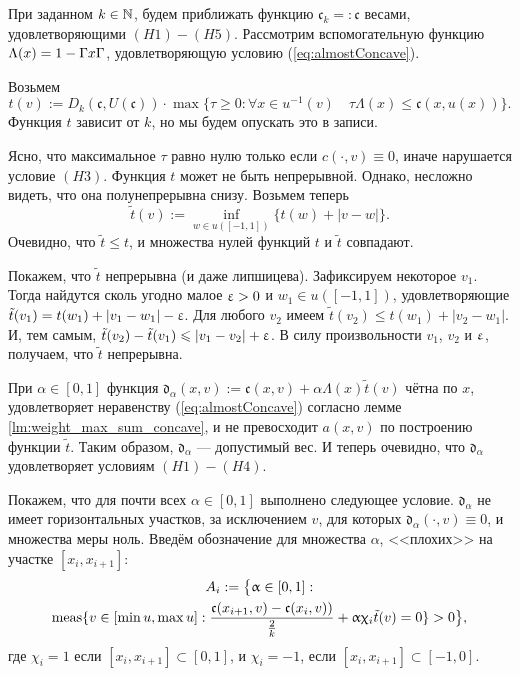 При заданном $k \in \mathbb N$, будем приближать функцию $\mathfrak c_k =: \mathfrak c$ весами, удовлетворяющими $(H1)-(H5)$.
Рассмотрим вспомогательную функцию $\Lambda(x) = 1 - \abs{x}$, удовлетворяющую условию (\ref{eq:almostConcave}).

Возьмем
$$
t(v):=D_k(\mathfrak c, U(\mathfrak c)) \cdot \max\{\tau \ge 0: \forall x \in u^{-1}(v) \quad \tau \Lambda(x) \le \mathfrak c(x, u(x))\}.
$$
Функция $t$ зависит от $k$, но мы будем опускать это в записи.

Ясно, что максимальное $\tau$ равно нулю только если $c(\cdot, v) \equiv 0$, иначе нарушается условие $(H3)$.
Функция $t$ может не быть непрерывной. Однако, несложно видеть, что она полунепрерывна снизу.
Возьмем теперь
$$
\tilde{t}(v) := \inf_{w \in u([-1, 1])} \{t(w) + |v - w|\}.
$$
Очевидно, что $\tilde{t} \le t$, и множества нулей функций $t$ и $\tilde{t}$ совпадают.

Покажем, что $\tilde{t}$ непрерывна (и даже липшицева).
Зафиксируем некоторое $v_1$.
Тогда найдутся сколь угодно малое $\upvarepsilon > 0$ и $w_1 \in u([-1, 1])$,
удовлетворяющие $\tilde{t}(v_1) = t(w_1) + |v_1 - w_1| - \upvarepsilon$.
Для любого $v_2$ имеем $\tilde{t}(v_2) \le t(w_1) + |v_2 - w_1|$.
И, тем самым, $\tilde{t}(v_2) - \tilde{t}(v_1) \leqslant |v_1 - v_2| + \upvarepsilon$.
В силу произвольности $v_1$, $v_2$ и $\upvarepsilon$, получаем, что $\tilde{t}$ непрерывна.

При $\alpha \in [0, 1]$ функция $\mathfrak d_\alpha(x, v) := \mathfrak c(x, v) + \alpha \Lambda(x) \tilde{t}(v)$
чётна по $x$, удовлетворяет неравенству (\ref{eq:almostConcave}) согласно лемме \ref{lm:weight_max_sum_concave},
и не превосходит $a(x, v)$ по построению функции $\tilde{t}$.
Таким образом, $\mathfrak d_\alpha$ --- допустимый вес.
И теперь очевидно, что $\mathfrak d_\alpha$ удовлетворяет условиям $(H1)-(H4)$.

Покажем, что для почти всех $\alpha \in [0, 1]$ выполнено следующее условие.
$\mathfrak d_{\alpha}$ не имеет горизонтальных участков,
за исключением $v$, для которых $\mathfrak d_{\alpha}(\cdot, v) \equiv 0$, и множества меры ноль.
Введём обозначение для множества $\alpha$, <<плохих>> на участке $[x_i, x_{i + 1}]$:
\begin{multline*}
A_i := \bigl \{\alpha \in [0, 1]: \\
\meas \{v \in [\min u, \max u]: \frac{\mathfrak c(x_{i + 1}, v) - \mathfrak c(x_i, v))}{\frac{2}{k}} + \alpha \chi_i \tilde{t} (v) = 0 \} > 0 \bigr \},
\end{multline*}
где $\chi_i = 1$ если $[x_i, x_{i + 1}] \subset [0, 1]$, и $\chi_i = -1$, если $[x_i, x_{i + 1}] \subset [-1, 0]$.

